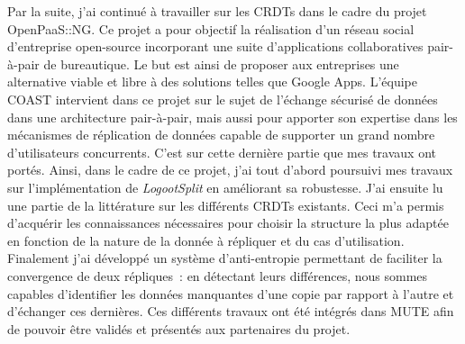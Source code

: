 \documentclass[11pt,a4paper,sans]{moderncv}        %
\newcommand{\tab}{\quad \quad}
\begin{document}

\tab Par la suite, j'ai continué à travailler sur les CRDTs dans le cadre du projet OpenPaaS::NG.
Ce projet a pour objectif la réalisation d'un réseau social d'entreprise open-source
incorporant une suite d'applications collaboratives pair-à-pair de bureautique.
Le but est ainsi de proposer aux entreprises
une alternative viable et libre à des solutions telles que Google Apps.
L'équipe COAST intervient dans ce projet sur le sujet de
l'échange sécurisé de données dans une architecture pair-à-pair,
mais aussi pour apporter son expertise dans les mécanismes de réplication de données
capable de supporter un grand nombre d'utilisateurs concurrents.
C'est sur cette dernière partie que mes travaux ont portés.
Ainsi, dans le cadre de ce projet, j'ai tout d'abord poursuivi mes travaux
sur l'implémentation de \emph{LogootSplit} en améliorant sa robustesse.
J'ai ensuite lu une partie de la littérature sur les différents CRDTs existants.
Ceci m'a permis d'acquérir les connaissances nécessaires pour choisir la structure la plus adaptée
en fonction de la nature de la donnée à répliquer et du cas d'utilisation.
Finalement j'ai développé un système d'anti-entropie
permettant de faciliter la convergence de deux répliques~:
en détectant leurs différences, nous sommes capables d'identifier les données
manquantes d'une copie par rapport à l'autre et d'échanger ces dernières.
Ces différents travaux ont été intégrés dans MUTE afin
de pouvoir être validés et présentés aux partenaires du projet.

\end{document}
